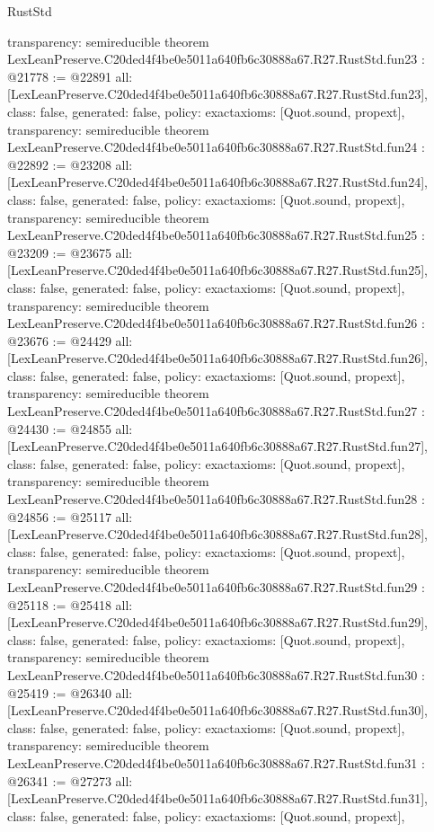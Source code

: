 \begin{lexlean}{RustStd}
\begin{coremodule}
{  transparency: semireducible
}
theorem LexLeanPreserve.C20ded4f4be0e5011a640fb6c30888a67.R27.RustStd.fun23 : @21778 := @22891 {
  all: [LexLeanPreserve.C20ded4f4be0e5011a640fb6c30888a67.R27.RustStd.fun23],
  class: false,
  generated: false,
  policy: exact{axioms: [Quot.sound, propext]},
  transparency: semireducible
}
theorem LexLeanPreserve.C20ded4f4be0e5011a640fb6c30888a67.R27.RustStd.fun24 : @22892 := @23208 {
  all: [LexLeanPreserve.C20ded4f4be0e5011a640fb6c30888a67.R27.RustStd.fun24],
  class: false,
  generated: false,
  policy: exact{axioms: [Quot.sound, propext]},
  transparency: semireducible
}
theorem LexLeanPreserve.C20ded4f4be0e5011a640fb6c30888a67.R27.RustStd.fun25 : @23209 := @23675 {
  all: [LexLeanPreserve.C20ded4f4be0e5011a640fb6c30888a67.R27.RustStd.fun25],
  class: false,
  generated: false,
  policy: exact{axioms: [Quot.sound, propext]},
  transparency: semireducible
}
theorem LexLeanPreserve.C20ded4f4be0e5011a640fb6c30888a67.R27.RustStd.fun26 : @23676 := @24429 {
  all: [LexLeanPreserve.C20ded4f4be0e5011a640fb6c30888a67.R27.RustStd.fun26],
  class: false,
  generated: false,
  policy: exact{axioms: [Quot.sound, propext]},
  transparency: semireducible
}
theorem LexLeanPreserve.C20ded4f4be0e5011a640fb6c30888a67.R27.RustStd.fun27 : @24430 := @24855 {
  all: [LexLeanPreserve.C20ded4f4be0e5011a640fb6c30888a67.R27.RustStd.fun27],
  class: false,
  generated: false,
  policy: exact{axioms: [Quot.sound, propext]},
  transparency: semireducible
}
theorem LexLeanPreserve.C20ded4f4be0e5011a640fb6c30888a67.R27.RustStd.fun28 : @24856 := @25117 {
  all: [LexLeanPreserve.C20ded4f4be0e5011a640fb6c30888a67.R27.RustStd.fun28],
  class: false,
  generated: false,
  policy: exact{axioms: [Quot.sound, propext]},
  transparency: semireducible
}
theorem LexLeanPreserve.C20ded4f4be0e5011a640fb6c30888a67.R27.RustStd.fun29 : @25118 := @25418 {
  all: [LexLeanPreserve.C20ded4f4be0e5011a640fb6c30888a67.R27.RustStd.fun29],
  class: false,
  generated: false,
  policy: exact{axioms: [Quot.sound, propext]},
  transparency: semireducible
}
theorem LexLeanPreserve.C20ded4f4be0e5011a640fb6c30888a67.R27.RustStd.fun30 : @25419 := @26340 {
  all: [LexLeanPreserve.C20ded4f4be0e5011a640fb6c30888a67.R27.RustStd.fun30],
  class: false,
  generated: false,
  policy: exact{axioms: [Quot.sound, propext]},
  transparency: semireducible
}
theorem LexLeanPreserve.C20ded4f4be0e5011a640fb6c30888a67.R27.RustStd.fun31 : @26341 := @27273 {
  all: [LexLeanPreserve.C20ded4f4be0e5011a640fb6c30888a67.R27.RustStd.fun31],
  class: false,
  generated: false,
  policy: exact{axioms: [Quot.sound, propext]},
}
\end{coremodule}
\end{lexlean}
